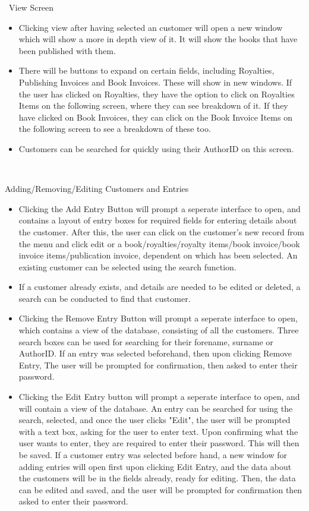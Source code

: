 \
View Screen
\begin{itemize}
    \item Clicking view after having selected an customer will open a new window which will show a more in depth view of it. It will show the books that have been published with them.
    \item There will be buttons to expand on certain fields, including Royalties, Publishing Invoices and Book Invoices. These will show in new windows. If the user has clicked on Royalties, they have the option to click on Royalties Items on the following screen, where they can see breakdown of it. If they have clicked on Book Invoices, they can click on the Book Invoice Items on the following screen to see a breakdown of these too.
    \item Customers can be searched for quickly using their AuthorID on this screen.
\end{itemize}

\

Adding/Removing/Editing Customers and Entries
\begin{itemize}
    \item Clicking the Add Entry Button will prompt a seperate interface to open, and contains a layout of entry boxes for required fields for entering details about the customer. After this, the user can click on the customer's new record from the menu and click edit or a book/royalties/royalty items/book invoice/book invoice items/publication invoice, dependent on which has been selected. An existing customer can be selected using the search function.
    \item If a customer already exists, and details are needed to be edited or deleted, a search can be conducted to find that customer.
    \item Clicking the Remove Entry Button will prompt a seperate interface to open, which contains a view of the database, consisting of all the customers. Three search boxes can be used for searching for their forename, surname or AuthorID. If an entry was selected beforehand, then upon clicking Remove Entry, The user will be prompted for confirmation, then asked to enter their password. 
    \item Clicking the Edit Entry button will prompt a seperate interface to open, and will contain a view of the database. An entry can be searched for using the search, selected, and once the user clicks "Edit", the user will be prompted with a text box, asking for the user to enter text. Upon confirming what the user wants to enter, they are required to enter their password. This will then be saved. If a customer entry was selected before hand, a new window for adding entries will open first upon clicking Edit Entry, and the data about the customers will be in the fields already, ready for editing. Then, the data can be edited and saved, and the user will be prompted for confirmation then asked to enter their password.
\end{itemize}

